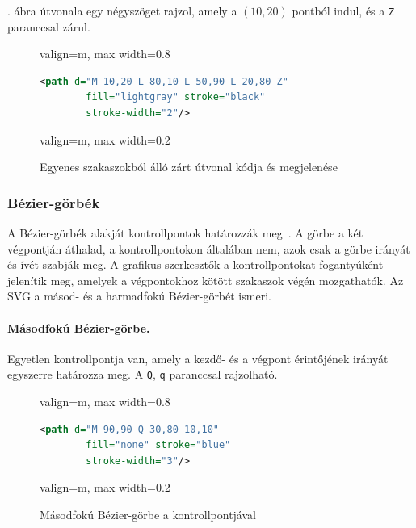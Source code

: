 . ábra útvonala egy négyszöget rajzol, amely a $(10, 20)$ pontból indul, és a \texttt{Z} paranccsal zárul.

\begin{figure}[H]
    \centering
    \begin{adjustbox}{valign=m, max width=0.8\textwidth}
        \begin{lstlisting}[language=XML]
    <path d="M 10,20 L 80,10 L 50,90 L 20,80 Z"
        fill="lightgray" stroke="black"
        stroke-width="2"/>
        \end{lstlisting}
    \end{adjustbox}
    \hfill
    \begin{adjustbox}{valign=m, max width=0.2\textwidth}
        
    \end{adjustbox}
    \caption{Egyenes szakaszokból álló zárt útvonal kódja és megjelenése}
    \label{fig:example_path_line}
\end{figure}


\subsubsection{Bézier-görbék}

A Bézier-görbék alakját kontrollpontok határozzák meg~\cite{mdn-bezier,bezier-primer,farin2002}. A görbe a két végpontján áthalad, a kontrollpontokon általában nem, azok csak a görbe irányát és ívét szabják meg. A grafikus szerkesztők a kontrollpontokat fogantyúként jelenítik meg, amelyek a végpontokhoz kötött szakaszok végén mozgathatók. Az SVG a másod- és a harmadfokú Bézier-görbét ismeri.

\paragraph{Másodfokú Bézier-görbe.} Egyetlen kontrollpontja van, amely a kezdő- és a végpont érintőjének irányát egyszerre határozza meg. A \texttt{Q}, \texttt{q} paranccsal rajzolható.

\begin{figure}[H]
    \centering
    \begin{adjustbox}{valign=m, max width=0.8\textwidth}
        \begin{lstlisting}[language=XML]
    <path d="M 90,90 Q 30,80 10,10"
        fill="none" stroke="blue"
        stroke-width="3"/>
        \end{lstlisting}
    \end{adjustbox}
    \hfill
    \begin{adjustbox}{valign=m, max width=0.2\textwidth}
        
    \end{adjustbox}
    \caption{Másodfokú Bézier-görbe a kontrollpontjával}
    \label{fig:example_path_quad_bezier}
\end{figure}

